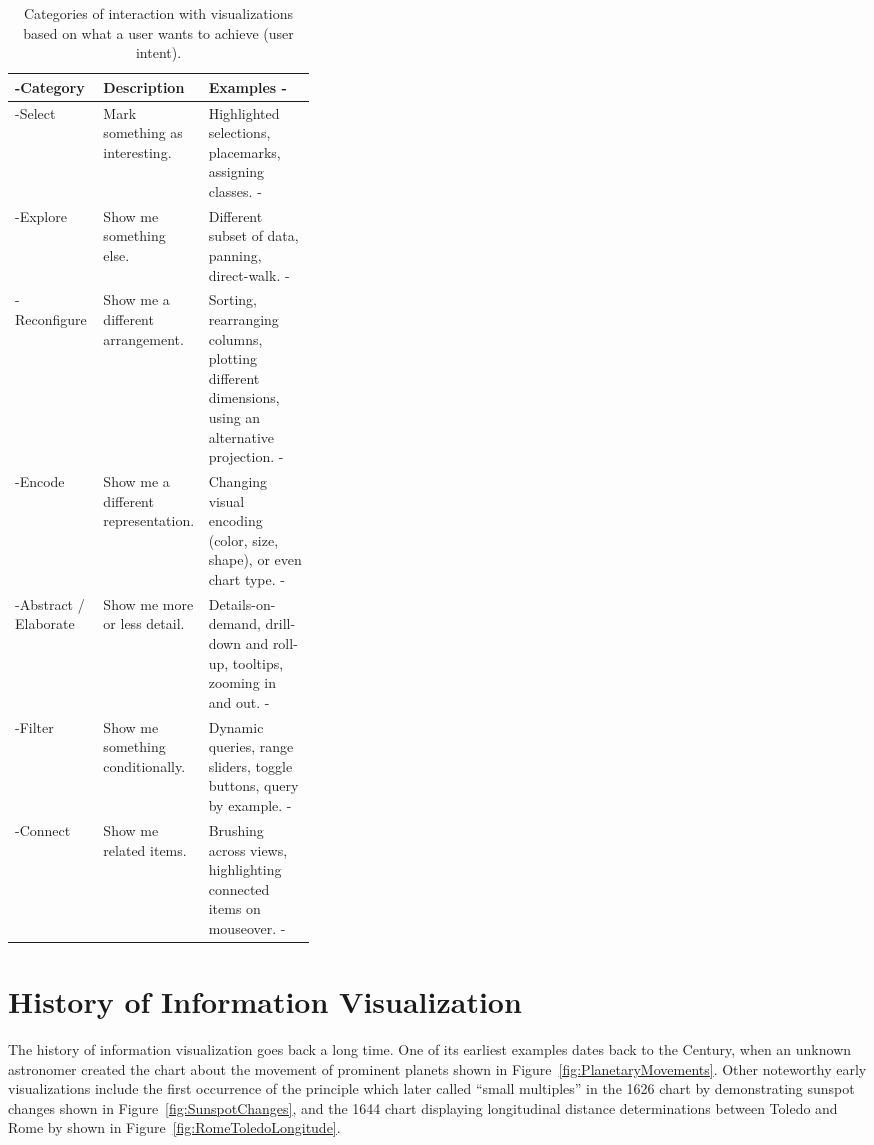 \begin{table}[tp]
\tablestretch
{}
\centering
\begin{small}
\begin{tabularx}{\linewidth}{>{\kern-\tabcolsep}lL{0.35\linewidth}X<{\kern-\tabcolsep}}
\toprule
Category & Description & Examples \\
\midrule
Select &
  Mark something as interesting. &
  Highlighted selections, placemarks, assigning classes. \\
Explore &
  Show me something else. &
  Different subset of data, panning, direct-walk. \\
Reconfigure &
  Show me a different arrangement. &
  Sorting, rearranging columns, plotting different dimensions, using an alternative projection. \\
Encode &
  Show me a different representation. &
  Changing visual encoding (color, size, shape), or even chart type. \\
Abstract / Elaborate &
  Show me more or less detail. &
  Details-on-demand, drill-down and roll-up, tooltips, zooming in and out. \\
Filter &
  Show me something conditionally. &
  Dynamic queries, range sliders, toggle buttons, query by example. \\
Connect &
  Show me related items. &
  Brushing across views, highlighting connected items on mouseover. \\
\bottomrule
\end{tabularx}
\end{small}
\caption[Categories of Interaction Based on User Intent]{
Categories of interaction with visualizations based on what
a user wants to achieve (user intent).
}
\label{tab:UserIntentCategories}
\end{table}






\section{History of Information Visualization}

The history of information visualization goes back a long time. One of
its earliest examples dates back to the  Century, when an
unknown astronomer created the chart about the movement of prominent
planets \parencite{CommentariiInSomniumScipionis} shown in
Figure~\ref{fig:PlanetaryMovements}.
Other noteworthy early visualizations include the first occurrence of
the principle which \textcite{VisualDisplayOfQuantitativeInformation}
later called \enquote{small multiples} in the 1626 chart by
\textcite{RosaUrsina} demonstrating sunspot changes shown in
Figure~\ref{fig:SunspotChanges}, and the 1644 chart displaying
longitudinal distance determinations between Toledo and Rome by \textcite{RomeToledoBook} shown in
Figure~\ref{fig:RomeToledoLongitude}.


